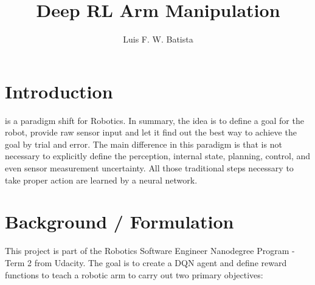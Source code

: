 \documentclass[10pt,journal,compsoc]{IEEEtran}
\begin{document}
\title{Deep RL Arm Manipulation}

\author{Luis F. W. Batista}

%
{}

\maketitle
\IEEEdisplaynontitleabstractindextext
\IEEEpeerreviewmaketitle
\section{Introduction}
\label{sec:introduction}

 is a paradigm shift for Robotics. In summary, the idea is to define a goal for the robot, provide raw sensor input and let it find out the best way to achieve the goal by trial and error. The main difference in this paradigm is that is not necessary to explicitly define the perception, internal state, planning, control, and even sensor measurement uncertainty. All those traditional steps necessary to take proper action are learned by a neural network. 

\section{Background / Formulation}
This project is part of the Robotics Software Engineer Nanodegree Program - Term 2 from Udacity. The goal is to create a DQN agent and define reward functions to teach a robotic arm to carry out two primary objectives: 
\end{document}
